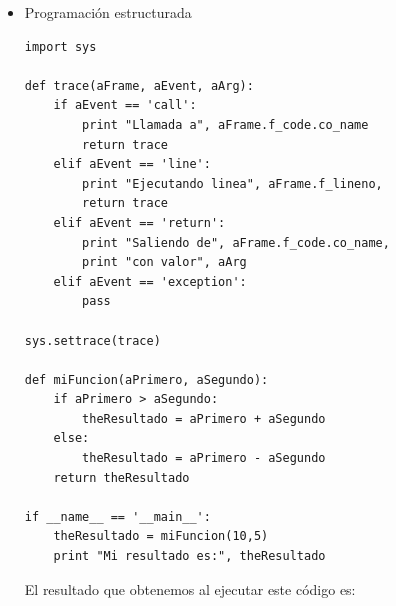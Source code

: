 \documentclass[12pt,legalpaper]{report}
\begin{document}
\begin{itemize}
	\item{Programación estructurada}

\begin{singlespace}
\begin{lstlisting}[style=Python]
import sys

def trace(aFrame, aEvent, aArg):
    if aEvent == 'call':
        print "Llamada a", aFrame.f_code.co_name
        return trace
    elif aEvent == 'line':
        print "Ejecutando linea", aFrame.f_lineno, 
        return trace
    elif aEvent == 'return':
        print "Saliendo de", aFrame.f_code.co_name, 
        print "con valor", aArg
    elif aEvent == 'exception':
        pass

sys.settrace(trace)

def miFuncion(aPrimero, aSegundo):
    if aPrimero > aSegundo:
        theResultado = aPrimero + aSegundo
    else:
        theResultado = aPrimero - aSegundo
    return theResultado

if __name__ == '__main__':
    theResultado = miFuncion(10,5)
    print "Mi resultado es:", theResultado
\end{lstlisting}
\end{singlespace}

El resultado que obtenemos al ejecutar este código es:
\end{itemize}
\end{document}
